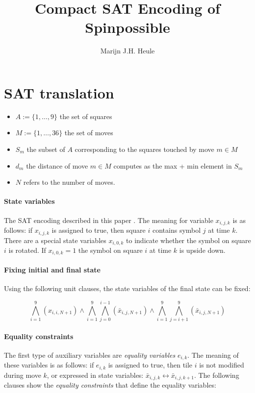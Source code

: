 \documentclass[]{llncs}
\author{Marijn J.H. Heule}
\institute{Department of Software Technology\\
Delft University of Technology\\
\email{marijn@heule.nl}}
\title{Compact SAT Encoding of Spinpossible}
\begin{document}
\maketitle


\section{SAT translation}

\begin{itemize}
\item $A := \{1,\dots,9\}$ the set of squares
\item $M := \{1,\dots,36\}$ the set of moves
\item $S_m$ the subset of $A$ corresponding to the squares touched by move $m \in M$
\item $d_m$ the distance of move $m \in M$ computes as the max + min element in $S_m$
\item $N$ refers to the number of moves.

\end{itemize}

\paragraph{State variables} The SAT encoding described in this paper . The meaning for variable $x_{i,j,k}$ is as follows: if $x_{i,j,k}$ is assigned to true, then square $i$ contains symbol $j$ at time $k$.
There are a special state variables $x_{i,0,k}$ to indicate whether the symbol on square $i$ is rotated. If $x_{i,0,k} = 1$ the symbol on square $i$ at time $k$ is upside down.  

\paragraph{Fixing initial and final state} Using the following unit clauses, the state variables of the final state can be fixed:

\begin{equation}
\bigwedge_{i=1}^9  (x_{i,i,N+1}) \land \bigwedge_{i=1}^9 \bigwedge_{j=0}^{i-1} (\bar x_{i,j ,N+1}) \land  \bigwedge_{i=1}^9 \bigwedge_{j=i+1}^{9} (\bar x_{i,j ,N+1})
\end{equation}

\paragraph{Equality constraints} The first type of auxiliary variables are {\em equality variables} $e_{i,k}$. The meaning of these variables is as follows: if $e_{i,k}$ is assigned to true, then 
tile $i$ is not modified during move $k$, or expressed in state variables: $\bar x_{i,j,k} \leftrightarrow \bar x_{i,j,k+1}$. The following clauses show the {\em equality constraints} that define
the equality variables:
\end{document}
